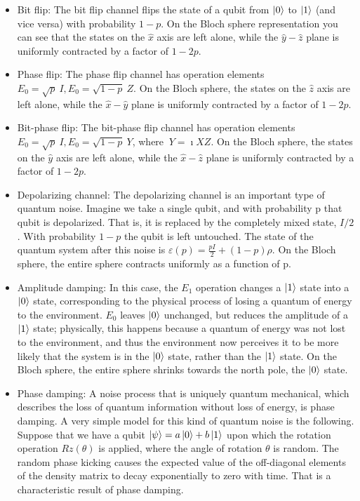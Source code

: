 \documentclass{article}
\begin{document}
    \begin{itemize}
        \item Bit ﬂip: The bit ﬂip channel ﬂips the state of a qubit from $\ket{0}$ to $\ket{1}$ (and vice versa) with probability $1 - p$. On the Bloch sphere representation you can see that the states on the $\hat{x}$ axis are left alone, while the $\hat{y}-\hat{z}$ plane is uniformly contracted by a factor of $1 - 2p$. 
        
        \item Phase flip: The phase ﬂip channel has operation elements $E_0 = \sqrt{p}\ I , E_0 = \sqrt{1 - p}\ Z $. On the Bloch sphere, the states on the $\hat{z}$ axis  are left alone, while the  $\hat{x}-\hat{y}$ plane is uniformly contracted by a factor of $1 - 2p$.

        \item Bit-phase flip: The bit-phase ﬂip channel has operation elements $E_0 = \sqrt{p}\ I , E_0 = \sqrt{1 - p}\ Y$, where $\ Y = \imath X Z $. On the Bloch sphere, the states on the $\hat{y}$  axis are left alone, while the $\hat{x}-\hat{z}$ plane is uniformly contracted by a factor of $1 - 2p$.

        \item Depolarizing channel: The depolarizing channel is an important type of quantum noise. Imagine we take a single qubit, and with probability p that qubit is depolarized. That is, it is replaced by the completely mixed state, $I/2$. With probability $1 - p$ the qubit is left untouched. The state of the quantum system after this noise is  $\varepsilon (p) = \frac{pI}{2} + (1- p)\rho$. On the Bloch sphere, the entire sphere contracts uniformly as a function of p. \cite{quantccompquantinfo}
        
        \item Amplitude damping: In this case, the $E_1$ operation changes a $\ket{1}$ state into a $\ket{0}$ state, corresponding to the physical process of losing a quantum of energy to the environment. $E_0$ leaves $\ket{0}$ unchanged, but reduces the amplitude of a $\ket{1}$ state; physically, this happens because a quantum of energy was not lost to the environment, and thus the environment now perceives it to be more likely that the system is in the $\ket{0}$ state, rather than the $\ket{1}$ state. On the Bloch sphere, the entire sphere shrinks towards the north pole, the $\ket{0}$ state. \cite{quantccompquantinfo}
        
        \item Phase damping: A noise process that is uniquely quantum mechanical, which describes the loss of quantum information without loss of energy, is phase damping. A very simple model for this kind of quantum noise is the following. Suppose that we have a qubit $\ket{\psi} = a \ket{0} + b \ket{1}$ upon which the rotation operation $Rz (\theta)$ is applied, where the angle of rotation $\theta$ is random. The random phase kicking causes the expected value of the off-diagonal elements of the density matrix to decay exponentially to zero with time. That is a characteristic result of phase damping. \cite{quantccompquantinfo}
        
    \end{itemize}
\end{document}
